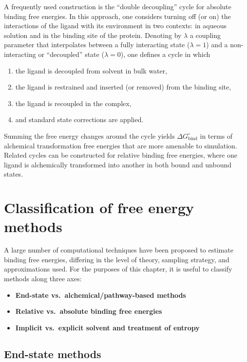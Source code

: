 \documentclass[12pt]{article}
\begin{document}
A frequently used construction is the ``double decoupling'' cycle for absolute binding free energies.\cite{CH10_gilson1997calculation,CH10_deng2009abfe} 
In this approach, one considers turning off (or on) the interactions of the ligand with its environment in two contexts: in aqueous solution and in the binding site of the protein. 
Denoting by \(\lambda\) a coupling parameter that interpolates between a fully interacting state (\(\lambda = 1\)) and a non-interacting or ``decoupled'' state (\(\lambda = 0\)), one defines a cycle in which
\begin{enumerate}
  \item the ligand is decoupled from solvent in bulk water,
  \item the ligand is restrained and inserted (or removed) from the binding site,
  \item the ligand is recoupled in the complex,
  \item and standard state corrections are applied. 
\end{enumerate}
Summing the free energy changes around the cycle yields \(\Delta G^\circ_\mathrm{bind}\) in terms of alchemical transformation free energies that are more amenable to simulation.
Related cycles can be constructed for relative binding free energies, where one ligand is alchemically transformed into another in both bound and unbound states. 

\section{Classification of free energy methods}

A large number of computational techniques have been proposed to estimate binding free energies, differing in the level of theory, sampling strategy, and approximations used. 
For the purposes of this chapter, it is useful to classify methods along three axes:
\begin{itemize}
  \item \textbf{End-state vs.\ alchemical/pathway-based methods}
  \item \textbf{Relative vs.\ absolute binding free energies}
  \item \textbf{Implicit vs.\ explicit solvent and treatment of entropy}
\end{itemize}

\subsection{End-state methods}
\end{document}
